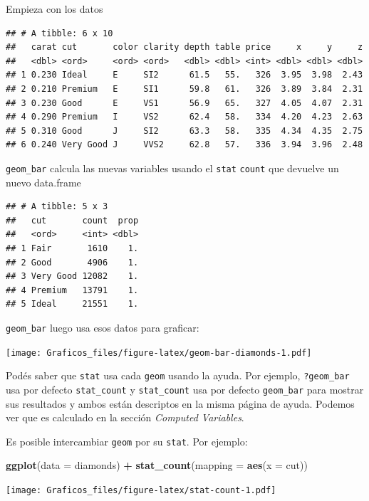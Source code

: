 \documentclass[]{book}
\newenvironment{Shaded}{\begin{snugshade}}{\end{snugshade}}
\newcommand{\DataTypeTok}[1]{\textcolor[rgb]{0.13,0.29,0.53}{#1}}
\newcommand{\KeywordTok}[1]{\textcolor[rgb]{0.13,0.29,0.53}{\textbf{#1}}}
\newcommand{\NormalTok}[1]{#1}
\newcommand{\OperatorTok}[1]{\textcolor[rgb]{0.81,0.36,0.00}{\textbf{#1}}}
\newcommand{\StringTok}[1]{\textcolor[rgb]{0.31,0.60,0.02}{#1}}
\theoremstyle{definition}
\theoremstyle{definition}
\theoremstyle{definition}
\theoremstyle{remark}
\begin{document}
Empieza con los datos

\begin{verbatim}
## # A tibble: 6 x 10
##   carat cut       color clarity depth table price     x     y     z
##   <dbl> <ord>     <ord> <ord>   <dbl> <dbl> <int> <dbl> <dbl> <dbl>
## 1 0.230 Ideal     E     SI2      61.5   55.   326  3.95  3.98  2.43
## 2 0.210 Premium   E     SI1      59.8   61.   326  3.89  3.84  2.31
## 3 0.230 Good      E     VS1      56.9   65.   327  4.05  4.07  2.31
## 4 0.290 Premium   I     VS2      62.4   58.   334  4.20  4.23  2.63
## 5 0.310 Good      J     SI2      63.3   58.   335  4.34  4.35  2.75
## 6 0.240 Very Good J     VVS2     62.8   57.   336  3.94  3.96  2.48
\end{verbatim}

\texttt{geom\_bar} calcula las nuevas variables usando el \texttt{stat}
\texttt{count} que devuelve un nuevo data.frame

\begin{verbatim}
## # A tibble: 5 x 3
##   cut       count  prop
##   <ord>     <int> <dbl>
## 1 Fair       1610    1.
## 2 Good       4906    1.
## 3 Very Good 12082    1.
## 4 Premium   13791    1.
## 5 Ideal     21551    1.
\end{verbatim}

\texttt{geom\_bar} luego usa esos datos para graficar:

\texttt{[image: Graficos\_files/figure-latex/geom-bar-diamonds-1.pdf]}

Podés saber que \texttt{stat} usa cada \texttt{geom} usando la ayuda.
Por ejemplo, \texttt{?geom\_bar} usa por defecto \texttt{stat\_count} y
\texttt{stat\_count} usa por defecto \texttt{geom\_bar} para mostrar sus
resultados y ambos están descriptos en la misma página de ayuda. Podemos
ver que es calculado en la sección \emph{Computed Variables}.

Es posible intercambiar \texttt{geom} por su \texttt{stat}. Por ejemplo:

\begin{Shaded}
\begin{Highlighting}[]
\KeywordTok{ggplot}\NormalTok{(}\DataTypeTok{data =}\NormalTok{ diamonds) }\OperatorTok{+}
\StringTok{  }\KeywordTok{stat_count}\NormalTok{(}\DataTypeTok{mapping =} \KeywordTok{aes}\NormalTok{(}\DataTypeTok{x =}\NormalTok{ cut))}
\end{Highlighting}
\end{Shaded}

\texttt{[image: Graficos\_files/figure-latex/stat-count-1.pdf]}
\end{document}
